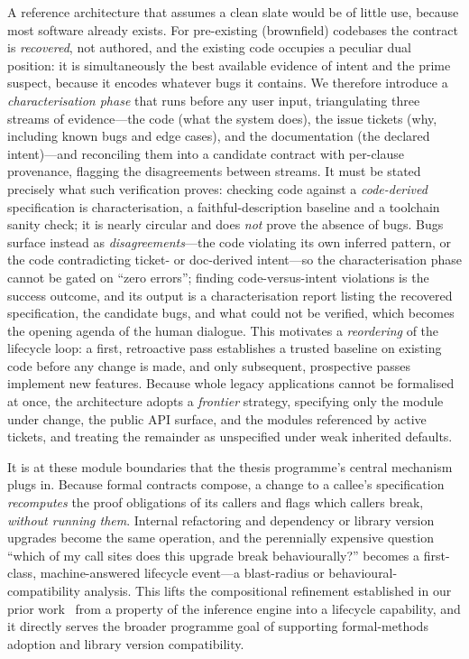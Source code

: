 A reference architecture that assumes a clean slate would be of little use, because most software already exists. For pre-existing (brownfield) codebases the contract is \emph{recovered}, not authored, and the existing code occupies a peculiar dual position: it is simultaneously the best available evidence of intent and the prime suspect, because it encodes whatever bugs it contains. We therefore introduce a \emph{characterisation phase} that runs before any user input, triangulating three streams of evidence---the code (what the system does), the issue tickets (why, including known bugs and edge cases), and the documentation (the declared intent)---and reconciling them into a candidate contract with per-clause provenance, flagging the disagreements between streams. It must be stated precisely what such verification proves: checking code against a \emph{code-derived} specification is characterisation, a faithful-description baseline and a toolchain sanity check; it is nearly circular and does \emph{not} prove the absence of bugs. Bugs surface instead as \emph{disagreements}---the code violating its own inferred pattern, or the code contradicting ticket- or doc-derived intent---so the characterisation phase cannot be gated on ``zero errors''; finding code-versus-intent violations is the success outcome, and its output is a characterisation report listing the recovered specification, the candidate bugs, and what could not be verified, which becomes the opening agenda of the human dialogue. This motivates a \emph{reordering} of the lifecycle loop: a first, retroactive pass establishes a trusted baseline on existing code before any change is made, and only subsequent, prospective passes implement new features. Because whole legacy applications cannot be formalised at once, the architecture adopts a \emph{frontier} strategy, specifying only the module under change, the public API surface, and the modules referenced by active tickets, and treating the remainder as unspecified under weak inherited defaults.

It is at these module boundaries that the thesis programme's central mechanism plugs in. Because formal contracts compose, a change to a callee's specification \emph{recomputes} the proof obligations of its callers and flags which callers break, \emph{without running them}. Internal refactoring and dependency or library version upgrades become the same operation, and the perennially expensive question ``which of my call sites does this upgrade break behaviourally?'' becomes a first-class, machine-answered lifecycle event---a blast-radius or behavioural-compatibility analysis. This lifts the compositional refinement established in our prior work~\cite{edmonds_article3} from a property of the inference engine into a lifecycle capability, and it directly serves the broader programme goal of supporting formal-methods adoption and library version compatibility.

